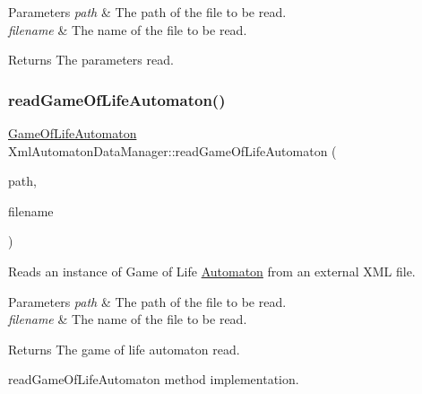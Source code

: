\begin{DoxyParams}{Parameters}
{\em path} & The path of the file to be read. \\
\hline
{\em filename} & The name of the file to be read. \\
\hline
\end{DoxyParams}
\begin{DoxyReturn}{Returns}
The parameters read. 
\end{DoxyReturn}
\mbox{\label{class_xml_automaton_data_manager_a23c0c0d1a7f5041f5969045e7cee1bdf}} 
\subsubsection{\texorpdfstring{read\+Game\+Of\+Life\+Automaton()}{readGameOfLifeAutomaton()}}
{\footnotesize\ttfamily \mbox{\hyperlink{class_game_of_life_automaton}{Game\+Of\+Life\+Automaton}} Xml\+Automaton\+Data\+Manager\+::read\+Game\+Of\+Life\+Automaton (\begin{DoxyParamCaption}\item[{Q\+String}]{path,  }\item[{Q\+String}]{filename }\end{DoxyParamCaption})}

Reads an instance of Game of Life \mbox{\hyperlink{class_automaton}{Automaton}} from an external X\+ML file.


\begin{DoxyParams}{Parameters}
{\em path} & The path of the file to be read. \\
\hline
{\em filename} & The name of the file to be read. \\
\hline
\end{DoxyParams}
\begin{DoxyReturn}{Returns}
The game of life automaton read.
\end{DoxyReturn}
read\+Game\+Of\+Life\+Automaton method implementation. \mbox{\label{class_xml_automaton_data_manager_ac1f0bb8c4dbb2e21828132f58613718f}} 
